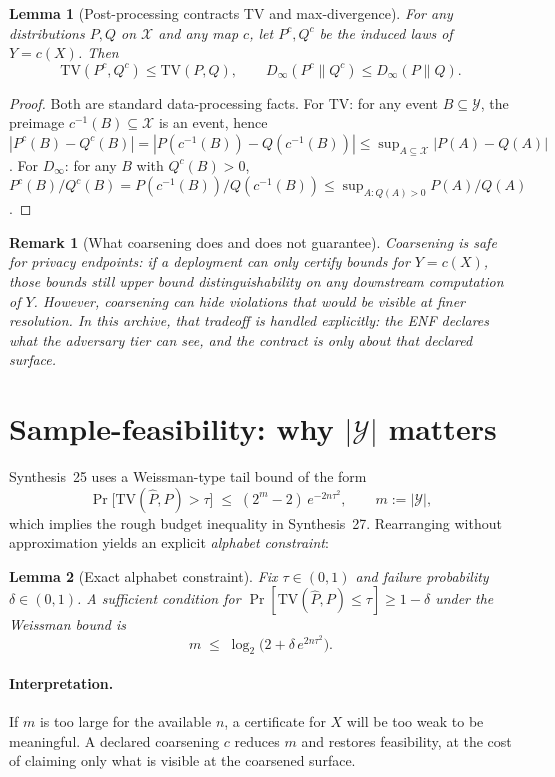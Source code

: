 \documentclass[11pt]{article}
\newtheorem{lemma}{Lemma}
\newtheorem{remark}{Remark}
\newcommand{\TV}{\mathrm{TV}}
\newcommand{\Dinfty}{D_{\infty}}
\begin{document}
\begin{lemma}[Post-processing contracts TV and max-divergence]\label{lem:dataproc}
For any distributions $P,Q$ on $\mathcal X$ and any map $c$, let $P^c,Q^c$ be the induced laws of $Y=c(X)$.
Then
\[\TV(P^c,Q^c)\le \TV(P,Q),\qquad \Dinfty(P^c\|Q^c)\le \Dinfty(P\|Q).\]
\end{lemma}

\begin{proof}
Both are standard data-processing facts.
For TV: for any event $B\subseteq\mathcal Y$, the preimage $c^{-1}(B)\subseteq\mathcal X$ is an event, hence
$|P^c(B)-Q^c(B)|=|P(c^{-1}(B))-Q(c^{-1}(B))|\le \sup_{A\subseteq\mathcal X}|P(A)-Q(A)|$.
For $\Dinfty$: for any $B$ with $Q^c(B)>0$,
$P^c(B)/Q^c(B)=P(c^{-1}(B))/Q(c^{-1}(B))\le \sup_{A:Q(A)>0} P(A)/Q(A)$.
\end{proof}

\begin{remark}[What coarsening does and does not guarantee]
Coarsening is \emph{safe for privacy endpoints}: if a deployment can only certify bounds for $Y=c(X)$, those bounds still upper bound distinguishability on any downstream computation of $Y$.
However, coarsening can hide violations that would be visible at finer resolution.
In this archive, that tradeoff is handled explicitly: the ENF declares what the adversary tier can see, and the contract is only about that declared surface.\cite{series:traceifaces}
\end{remark}

\section{Sample-feasibility: why $|\mathcal Y|$ matters}
Synthesis~25 uses a Weissman-type tail bound of the form
\[\Pr\big[\TV(\widehat P,P) > \tau\big]\;\le\; (2^{m}-2)\,e^{-2n\tau^2},\qquad m:=|\mathcal Y|,\]
which implies the rough budget inequality in Synthesis~27.\cite{series:stataudit,series:bucketdesign}
Rearranging without approximation yields an explicit \emph{alphabet constraint}:
\begin{lemma}[Exact alphabet constraint]\label{lem:alphabet}
Fix $\tau\in(0,1)$ and failure probability $\delta\in(0,1)$.
A sufficient condition for $\Pr[\TV(\widehat P,P)\le \tau]\ge 1-\delta$ under the Weissman bound is
\[m\;\le\;\log_2\!\bigl(2+\delta\,e^{2n\tau^2}\bigr).\]
\end{lemma}

\paragraph{Interpretation.}
If $m$ is too large for the available $n$, a certificate for $X$ will be too weak to be meaningful.
A declared coarsening $c$ reduces $m$ and restores feasibility, at the cost of claiming only what is visible at the coarsened surface.
\end{document}
